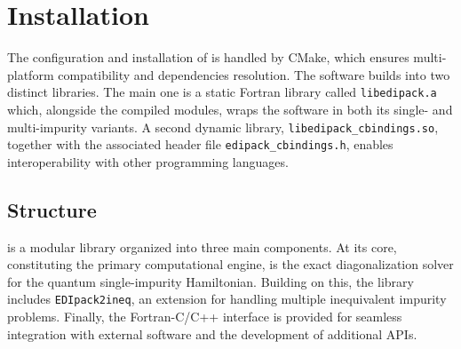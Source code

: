\documentclass[edipack_sp.tex]{subfiles}
\begin{document}
\section{Installation}\label{SecInstall}
The configuration and installation of \NAME is handled by CMake, which ensures
multi-platform compatibility and dependencies resolution.  
The software builds into two distinct libraries.
The main one is a static Fortran library called {\tt libedipack.a} which, alongside the compiled
modules, wraps the \NAME software in both its single- and multi-impurity variants.
A second dynamic library, {\tt libedipack\_cbindings.so}, together with the associated header
file {\tt edipack\_cbindings.h}, enables interoperability with other programming languages.  


\subsection{Structure}\label{sSecInstallStructure}
\NAME is a modular library organized into three main components. At its 
core, constituting the primary computational engine, 
is the exact diagonalization solver for the quantum single-impurity Hamiltonian.
Building on this, the library includes 
{\tt EDIpack2ineq}, an extension for handling multiple inequivalent 
impurity problems. Finally, the Fortran-C/C++ interface is provided for 
seamless integration with external software and the development of 
additional APIs.
\end{document}
